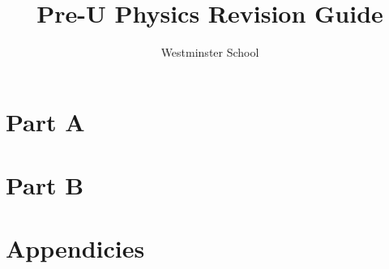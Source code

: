 \documentclass[a4paper,11pt,twoside]{memoir}
\title{Pre-U Physics Revision Guide}
\author{Westminster School}
\newcounter{spec}[chapter]
\begin{document}
\raggedbottom
\frontmatter
\begin{titlingpage}
	\maketitle
		\thispagestyle{empty}
\end{titlingpage}

\tableofcontents



\mainmatter
\part*{Part A}









\part*{Part B}











\appendix
\part*{Appendicies}



\backmatter
\end{document}
